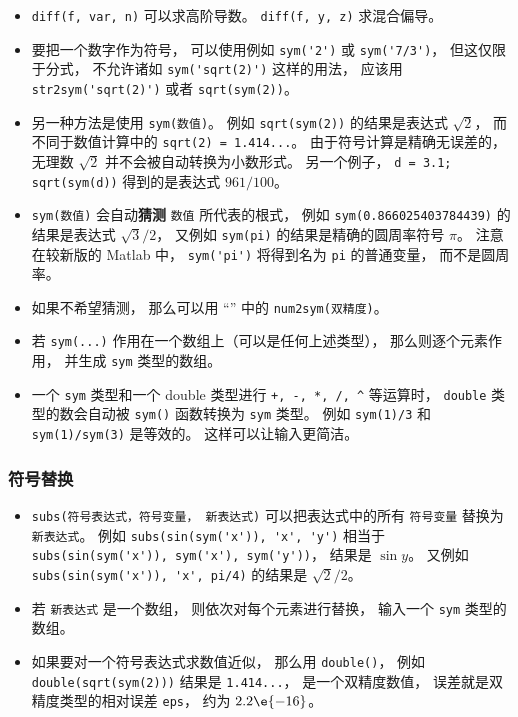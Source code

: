 \begin{itemize}
\item \verb`diff(f, var, n)` 可以求高阶导数。 \verb`diff(f, y, z)` 求混合偏导。

\item  要把一个数字作为符号， 可以使用例如 \verb`sym('2')` 或 \verb`sym('7/3')`， 但这仅限于分式， 不允许诸如 \verb`sym('sqrt(2)')` 这样的用法， 应该用 \verb`str2sym('sqrt(2)')` 或者 \verb`sqrt(sym(2))`。

\item 另一种方法是使用 \verb`sym(数值)`。 例如 \verb`sqrt(sym(2))` 的结果是表达式 $\sqrt 2$， 而不同于数值计算中的 \verb`sqrt(2) = 1.414...`。 由于符号计算是精确无误差的， 无理数 $\sqrt{2}$ 并不会被自动转换为小数形式。 另一个例子， \verb`d = 3.1; sqrt(sym(d))` 得到的是表达式 $961/100$。

\item  \verb`sym(数值)` 会自动\textbf{猜测} \verb`数值` 所代表的根式， 例如 \verb`sym(0.866025403784439)` 的结果是表达式 $\sqrt{3}/2$， 又例如 \verb`sym(pi)` 的结果是精确的圆周率符号 $\pi$。 注意在较新版的 Matlab 中， \verb`sym('pi')` 将得到名为 \verb`pi` 的普通变量， 而不是圆周率。

\item 如果不希望猜测， 那么可以用 “” 中的 \verb`num2sym(双精度)`。

\item 若 \verb`sym(...)` 作用在一个数组上（可以是任何上述类型）， 那么则逐个元素作用， 并生成 \verb`sym` 类型的数组。

\item 一个 \verb`sym` 类型和一个 double 类型进行 \verb`+, -, *, /, ^` 等运算时， \verb`double` 类型的数会自动被 \verb`sym()` 函数转换为 \verb`sym` 类型。 例如 \verb`sym(1)/3` 和 \verb`sym(1)/sym(3)` 是等效的。 这样可以让输入更简洁。
\end{itemize}

\subsubsection{符号替换}
\begin{itemize}
\item \verb`subs(符号表达式，符号变量， 新表达式)` 可以把表达式中的所有 \verb`符号变量` 替换为 \verb`新表达式`。 例如 \verb`subs(sin(sym('x')), 'x', 'y')` 相当于 \verb`subs(sin(sym('x')), sym('x'), sym('y'))`， 结果是 $\sin y$。 又例如 \verb`subs(sin(sym('x')), 'x', pi/4)` 的结果是 $\sqrt 2/2$。
\item 若 \verb`新表达式` 是一个数组， 则依次对每个元素进行替换， 输入一个 \verb`sym` 类型的数组。
\item 如果要对一个符号表达式求数值近似， 那么用 \verb`double()`， 例如 \verb`double(sqrt(sym(2)))` 结果是 \verb`1.414...`， 是一个双精度数值， 误差就是双精度类型的相对误差 \verb`eps`， 约为 $2.2\e{-16}$。
\end{itemize}

